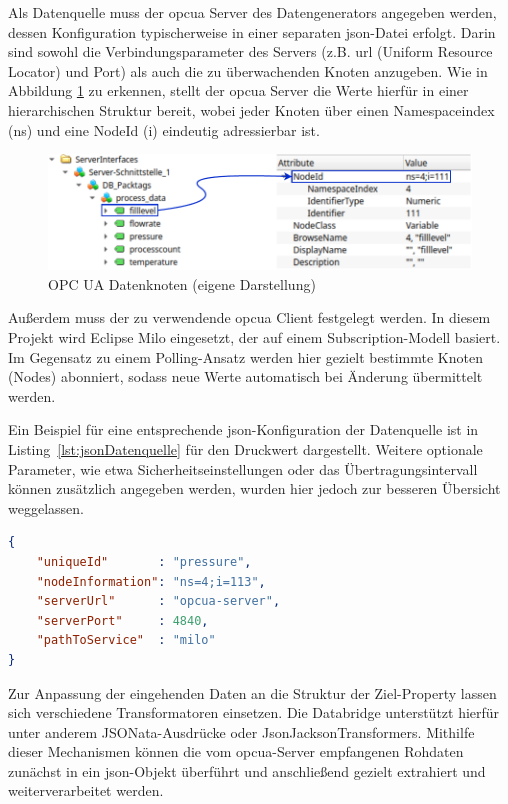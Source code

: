 Als Datenquelle muss der \acs{opcua} Server des Datengenerators angegeben werden, dessen Konfiguration typischerweise in einer separaten \acs{json}-Datei erfolgt.
Darin sind sowohl die Verbindungsparameter des Servers (z.B. \acs{url} (Uniform Resource Locator) und Port) als auch die zu überwachenden Knoten anzugeben.
Wie in Abbildung \ref{fig:OPCUADatenStruktur} zu erkennen, stellt der \acs{opcua} Server die Werte hierfür in einer hierarchischen Struktur bereit, wobei jeder Knoten über einen Namespaceindex (ns) und eine NodeId (i) eindeutig adressierbar ist.

\begin{figure}[htbp]
    \centering
    \includegraphics{Bilder/OPCUA/OPCUADaten.pdf}
    \caption[OPC UA Datenknoten]{OPC UA Datenknoten (eigene Darstellung)}
    \label{fig:OPCUADatenStruktur}
\end{figure}

Außerdem muss der zu verwendende \acs{opcua} Client festgelegt werden.
In diesem Projekt wird Eclipse Milo eingesetzt, der auf einem Subscription-Modell basiert.
Im Gegensatz zu einem Polling-Ansatz werden hier gezielt bestimmte Knoten (Nodes) abonniert, sodass neue Werte automatisch bei Änderung übermittelt werden.

Ein Beispiel für eine entsprechende \acs{json}-Konfiguration der Datenquelle ist in Listing~\ref{lst:jsonDatenquelle} für den Druckwert dargestellt.
Weitere optionale Parameter, wie etwa Sicherheitseinstellungen oder das Übertragungsintervall können zusätzlich angegeben werden, wurden hier jedoch zur besseren Übersicht weggelassen.

\newpage
\begin{lstlisting}[language=json, caption={Beispielhafte \acs{json}-Konfiguration einer Datenquelle}, label={lst:jsonDatenquelle}]
{
    "uniqueId"       : "pressure",
    "nodeInformation": "ns=4;i=113",
    "serverUrl"      : "opcua-server",
    "serverPort"     : 4840,
    "pathToService"  : "milo"
}
\end{lstlisting}

Zur Anpassung der eingehenden Daten an die Struktur der Ziel-Property lassen sich verschiedene Transformatoren einsetzen.
Die Databridge unterstützt hierfür unter anderem JSONata-Ausdrücke oder JsonJacksonTransformers.
Mithilfe dieser Mechanismen können die vom \acs{opcua}-Server empfangenen Rohdaten zunächst in ein \acs{json}-Objekt überführt und anschließend gezielt extrahiert und weiterverarbeitet werden.

